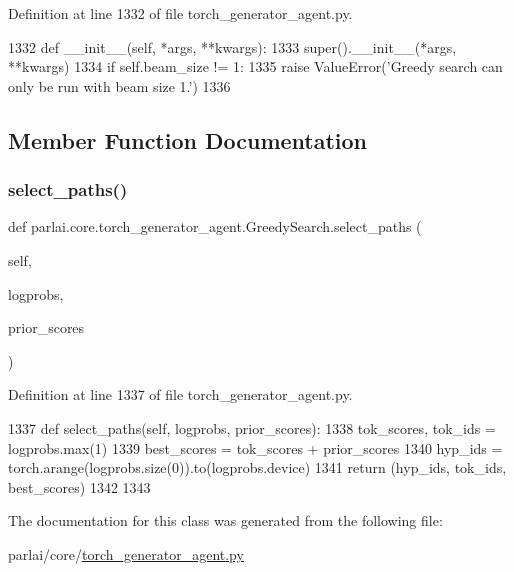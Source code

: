 Definition at line 1332 of file torch\+\_\+generator\+\_\+agent.\+py.


\begin{DoxyCode}
1332     \textcolor{keyword}{def }\_\_init\_\_(self, *args, **kwargs):
1333         super().\_\_init\_\_(*args, **kwargs)
1334         \textcolor{keywordflow}{if} self.beam\_size != 1:
1335             \textcolor{keywordflow}{raise} ValueError(\textcolor{stringliteral}{'Greedy search can only be run with beam size 1.'})
1336 
\end{DoxyCode}


\subsection{Member Function Documentation}
\mbox{\label{classparlai_1_1core_1_1torch__generator__agent_1_1GreedySearch_aa201e7824f50e2830cede9adc4bffcd6}} 
\subsubsection{\texorpdfstring{select\+\_\+paths()}{select\_paths()}}
{\footnotesize\ttfamily def parlai.\+core.\+torch\+\_\+generator\+\_\+agent.\+Greedy\+Search.\+select\+\_\+paths (\begin{DoxyParamCaption}\item[{}]{self,  }\item[{}]{logprobs,  }\item[{}]{prior\+\_\+scores }\end{DoxyParamCaption})}



Definition at line 1337 of file torch\+\_\+generator\+\_\+agent.\+py.


\begin{DoxyCode}
1337     \textcolor{keyword}{def }select\_paths(self, logprobs, prior\_scores):
1338         tok\_scores, tok\_ids = logprobs.max(1)
1339         best\_scores = tok\_scores + prior\_scores
1340         hyp\_ids = torch.arange(logprobs.size(0)).to(logprobs.device)
1341         \textcolor{keywordflow}{return} (hyp\_ids, tok\_ids, best\_scores)
1342 
1343 
\end{DoxyCode}


The documentation for this class was generated from the following file\+:\begin{DoxyCompactItemize}
\item 
parlai/core/\hyperlink{torch__generator__agent_8py}{torch\+\_\+generator\+\_\+agent.\+py}\end{DoxyCompactItemize}
